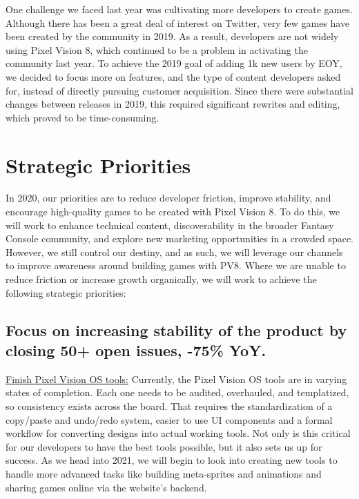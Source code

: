 \documentclass{sixpage}
\begin{document}
    One challenge we faced last year was cultivating more developers to create games.
    Although there has been a great deal of interest on Twitter, very few games have been created by the community in 2019.
    As a result, developers are not widely using Pixel Vision 8, which continued to be a problem in activating the community last year.
    To achieve the 2019 goal of adding 1k new users by EOY, we decided to focus more on features, and the type of content developers asked for, instead of directly pursuing customer acquisition.
    Since there were substantial changes between releases in 2019, this required significant rewrites and editing, which proved to be time-consuming.


    \section{Strategic Priorities}
    In 2020, our priorities are to reduce developer friction, improve stability, and encourage high-quality games to be created with Pixel Vision 8.
    To do this, we will work to enhance technical content, discoverability in the broader Fantasy Console community, and explore new marketing opportunities in a crowded space.
    However, we still control our destiny, and as such, we will leverage our channels to improve awareness around building games with PV8.
    Where we are unable to reduce friction or increase growth organically, we will work to achieve the following strategic priorities:

    \subsection{Focus on increasing stability of the product by closing 50+ open issues, -75\% YoY.}
    \underline{Finish Pixel Vision OS tools:} Currently, the Pixel Vision OS tools are in varying states of completion.
    Each one needs to be audited, overhauled, and templatized, so consistency exists across the board.
    That requires the standardization of a copy/paste and undo/redo system, easier to use UI components and a formal workflow for converting designs into actual working tools.
    Not only is this critical for our developers to have the best tools possible, but it also sets us up for success.
    As we head into 2021, we will begin to look into creating new tools to handle more advanced tasks like building meta-sprites and animations and sharing games online via the website's backend.


    \newpage
\end{document}
